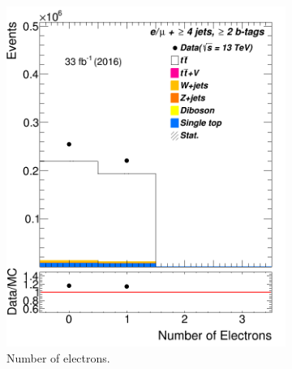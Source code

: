 \begin{figure}
\begin{subfigure}{0.25\textwidth}
		\includegraphics[width=\linewidth]{ControlPlots_emujets_2016_4incl_2incl/el_n_emujets_2016.png}
		\caption{Number of electrons.} \label{fig:b1}
	\end{subfigure}\hspace*{1.0cm}
	\begin{subfigure}{0.25\textwidth}

\end{subfigure}
\end{figure}
